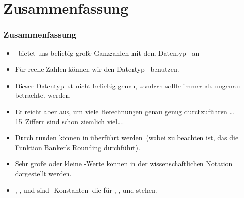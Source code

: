\documentclass[aspectratio=169,mathserif,notheorems]{beamer}%
\begin{document}
\section{Zusammenfassung}%
%
\begin{frame}%
\frametitle{Zusammenfassung}%
\begin{itemize}%
\item \python\ bietet uns beliebig große Ganzzahlen mit dem Datentyp~ an.%
\item<2-> Für reelle Zahlen können wir den Datentyp~ benutzen.%
\item<3-> Dieser Datentyp ist \alert{nicht} beliebig genau, sondern sollte \alert{immer} als ungenau betrachtet werden.%
\item<4-> Er reicht aber aus, um viele Berechnungen genau genug durchzuführen {\dots} 15~Ziffern sind schon ziemlich viel\dots.%
\item<5-> Durch runden können  in  überführt werden~(wobei zu beachten ist, das die Funktion  Banker's Rounding durchführt).%
\item<6-> Sehr große oder kleine -Werte können in der wissenschaftlichen Notation dargestellt werden.%
\item<7-> , , und  sind -Konstanten, die für , , und  stehen.%
\end{itemize}%
\end{frame}%
%
\endPresentation%
\end{document}
